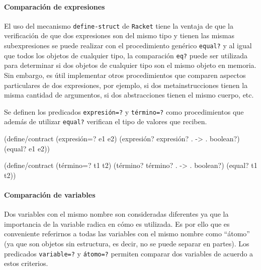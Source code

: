 \documentclass[10pt,oneside,openany,letterpaper]{book}
\begin{document}
\paragraph{Comparación de expresiones} El uso del mecanismo {\tt{}define-struct} de {\tt{}Racket} tiene la ventaja de que la verificación de que dos expresiones son del mismo tipo y tienen las mismas subexpresiones se puede realizar con el procedimiento genérico {\tt{}equal?} y al igual que todos los objetos de cualquier tipo, la comparación {\tt{}eq?} puede ser utilizada para determinar si dos objetos de cualquier tipo son el mismo objeto en memoria. Sin embargo, es útil implementar otros procedimientos que comparen aspectos particulares de dos expresiones, por ejemplo, si dos metainstrucciones tienen la misma cantidad de argumentos, si dos abstracciones tienen el mismo cuerpo, etc.

Se definen los predicados {\tt{}\protect{}expresión=?} y {\tt{}\protect{}término=?} como procedimientos que además de utilizar {\tt{}equal?} verifican el tipo de valores que reciben.

\nwenddocs{}\endmoddef
(define/contract (expresión=? e1 e2)
  (expresión? expresión? . -> . boolean?)
  (equal? e1 e2))

(define/contract (término=? t1 t2)
  (término? término? . -> . boolean?)
  (equal? t1 t2))
\eatline
{}\nwendcode{}\nwdocspar

\paragraph{Comparación de variables} Dos variables con el mismo nombre son consideradas diferentes ya que la importancia de la variable radica en cómo es utilizada. Es por ello que es conveniente referirnos a todas las variables con el mismo nombre como ``átomo'' (ya que son objetos sin estructura, es decir, no se puede separar en partes). Los predicados {\tt{}\protect{}variable\protect{}=?} y {\tt{}\protect{}átomo=?} permiten comparar dos variables de acuerdo a estos criterios.
\end{document}
